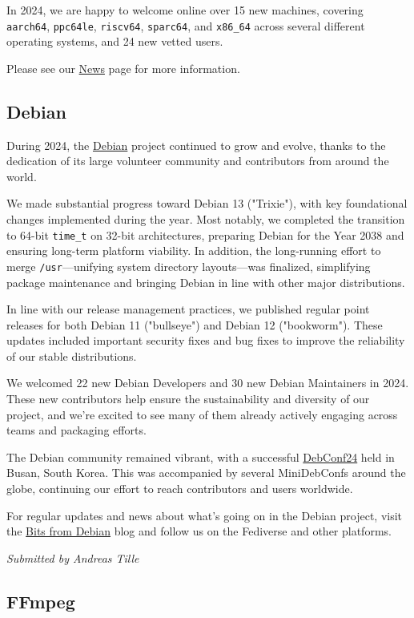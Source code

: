 \documentclass[a4paper]{report}
\begin{document}
In 2024, we are happy to welcome online over 15 new machines, covering {\tt aarch64}, {\tt ppc64le}, {\tt riscv64}, {\tt sparc64}, and {\tt x86\_64} across several different operating systems, and 24 new vetted users.

Please see our \href{https://portal.cfarm.net/news/}{News} page for more information.

\subsection{Debian}

During 2024, the \href{https://www.debian.org/}{Debian} project continued to grow and evolve, thanks to the dedication of its large volunteer community and contributors from around the world.

We made substantial progress toward Debian 13 ("Trixie"), with key foundational changes implemented during the year. Most notably, we completed the transition to 64-bit \texttt{time\_t} on 32-bit architectures, preparing Debian for the Year 2038 and ensuring long-term platform viability. In addition, the long-running effort to merge \texttt{/usr}—unifying system directory layouts—was finalized, simplifying package maintenance and bringing Debian in line with other major distributions.

In line with our release management practices, we published regular point releases for both Debian 11 ("bullseye") and Debian 12 ("bookworm"). These updates included important security fixes and bug fixes to improve the reliability of our stable distributions.

We welcomed 22 new Debian Developers and 30 new Debian Maintainers in 2024. These new contributors help ensure the sustainability and diversity of our project, and we’re excited to see many of them already actively engaging across teams and packaging efforts.

The Debian community remained vibrant, with a successful \href{https://debconf24.debconf.org/}{DebConf24} held in Busan, South Korea. This was accompanied by several MiniDebConfs around the globe, continuing our effort to reach contributors and users worldwide.

For regular updates and news about what’s going on in the Debian project, visit the \href{https://bits.debian.org/}{Bits from Debian} blog and follow us on the Fediverse and other platforms.

{\em Submitted by Andreas Tille}

\subsection{FFmpeg}
\end{document}
